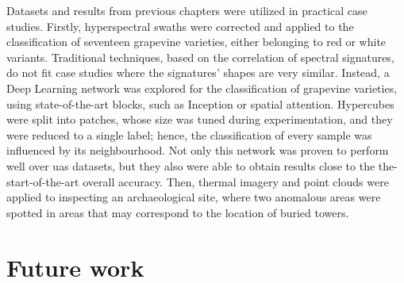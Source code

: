 Datasets and results from previous chapters were utilized in practical case studies. Firstly, hyperspectral swaths were corrected and applied to the classification of seventeen grapevine varieties, either belonging to red or white variants. Traditional techniques, based on the correlation of spectral signatures, do not fit case studies where the signatures' shapes are very similar. Instead, a Deep Learning network was explored for the classification of grapevine varieties, using state-of-the-art blocks, such as Inception or spatial attention. Hypercubes were split into patches, whose size was tuned during experimentation, and they were reduced to a single label; hence, the classification of every sample was influenced by its neighbourhood. Not only this network was proven to perform well over \acrshort{uas} datasets, but they also were able to obtain results close to the the-start-of-the-art overall accuracy. Then, thermal imagery and point clouds were applied to inspecting an archaeological site, where two anomalous areas were spotted in areas that may correspond to the location of buried towers. 

\section{Future work}


